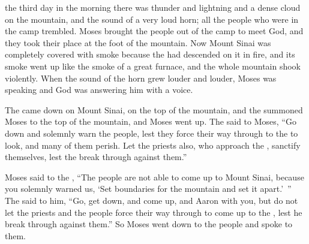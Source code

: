 {the third
day
in the morning
there was
thunder
and lightning
and a dense
cloud
on
the mountain,
and the sound
of a very
loud
horn;
all
the people
who
were in the camp
trembled.
Moses
brought
the
people
out of the camp
to meet
God,
and they took their place at the foot
of the mountain.
Now Mount
Sinai
was completely
covered with smoke
because
the {}
had
descended
on
it in fire,
and its smoke
went up
like the smoke
of a great furnace,
and the whole
mountain
shook violently.
When
the sound
of the horn
grew louder
and louder,
Moses
was speaking
and God
was answering him
with a voice.
\par }{\PP {}The
{}
came down
on
Mount
Sinai,
on the top
of the mountain,
and the
{}
summoned
Moses
to
the top
of the mountain,
and Moses
went up.
The
{}
said
to
Moses,
“Go down
and solemnly
warn the people,
lest
they force
their way through to
the {}
to look,
and many
of them perish.
Let the priests
also,
who approach
the {}, sanctify
themselves, lest
the {}
break through against them.”
\par }{\PP {}Moses
said
to
the {}, “The people
are not
able
to come up
to
Mount
Sinai,
because
you
solemnly
warned
us, ‘Set boundaries
for the mountain
and set it apart.’ ”
The
{}
said
to him,
“Go,
get down,
and come up,
and Aaron
with
you,
but do not
let the priests
and the people
force
their way through to come up
to
the {}, lest
he break through against them.”
So Moses
went down
to
the people
and spoke
to them.


}
